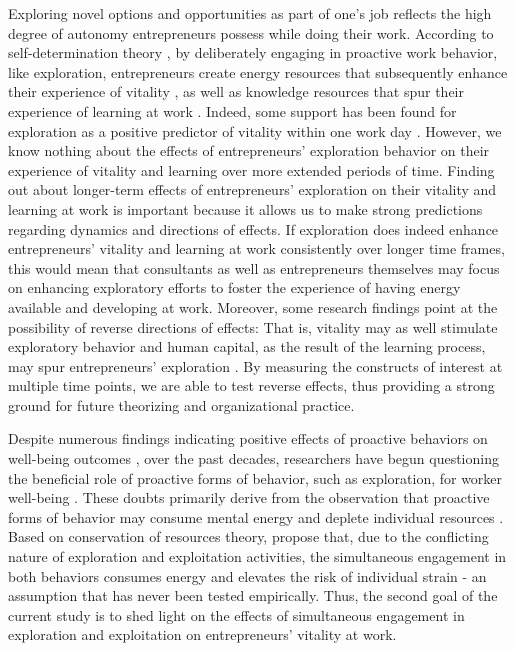 \documentclass[man, 12pt, a4paper, noextraspace]{apa6}
\begin{document}
Exploring novel options and opportunities as part of one's job reflects the high degree of autonomy entrepreneurs possess while doing their work.   
According to self-determination theory \parencite[SDT;][]{Ryan2001}, by deliberately engaging in proactive work behavior, like exploration, entrepreneurs create energy resources that subsequently enhance their experience of vitality \parencite{Spreitzer.2005b}, as well as knowledge resources that spur their experience of learning at work \parencite[e.g.][]{Kolb2009, Spreitzer.2005b}. 
Indeed, some support has been found for exploration as a positive predictor of vitality within one work day \textcite{Niessen.2012}.
However, we know nothing about the effects of entrepreneurs' exploration behavior on their experience of vitality and learning over more extended periods of time. 
Finding out about longer-term effects of entrepreneurs' exploration on their vitality and learning at work is important because it allows us to make strong predictions regarding dynamics and directions of effects. 
If exploration does indeed enhance entrepreneurs' vitality and learning at work consistently over longer time frames, this would mean that consultants as well as entrepreneurs themselves may focus on enhancing exploratory efforts to foster the experience of having energy available and developing at work. 
Moreover, some research findings point at the possibility of reverse directions of effects: That is, vitality may as well stimulate exploratory behavior \parencite[e.g.,][]{Carmeli2009} and human capital, as the result of the learning process, may spur entrepreneurs' exploration \parencite[e.g.,][]{Marin-Idarraga2016}.
By measuring the constructs of interest at multiple time points, we are able to test reverse effects, thus providing a strong ground for future theorizing and organizational practice. \par 

Despite numerous findings indicating positive effects of proactive behaviors on well-being outcomes \parencite[see]{Bindl.2010}, over the past decades, researchers have begun questioning the beneficial role of proactive forms of behavior, such as exploration, for worker well-being \parencite[e.g.,][]{Bolino.2010, Strauss2017, Parker2019}. 
These doubts primarily derive from the observation that proactive forms of behavior may consume mental energy \parencite{Bolino.2010} and deplete individual resources \parencite{Grant.2011}. 
Based on conservation of resources \parencite[COR;][]{Hobfoll.1989} theory, \textcite{Hunter2017} propose that, due to the conflicting nature of exploration and exploitation activities, the simultaneous engagement in both behaviors consumes energy and elevates the risk of individual strain - an assumption that has never been tested empirically. 
Thus, the second goal of the current study is to shed light on the effects of simultaneous engagement in exploration and exploitation on entrepreneurs' vitality at work. \par 
\end{document}
